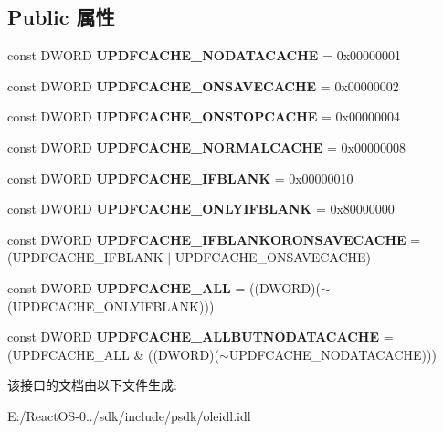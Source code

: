 \subsection*{Public 属性}
\begin{DoxyCompactItemize}
\item 
\mbox{\label{interface_i_ole_cache2_a8d7edcb3d1e03635a0eaf0445adca589}} 
const D\+W\+O\+RD {\bfseries U\+P\+D\+F\+C\+A\+C\+H\+E\+\_\+\+N\+O\+D\+A\+T\+A\+C\+A\+C\+HE} = 0x00000001
\item 
\mbox{\label{interface_i_ole_cache2_a38453c6f32d415d544967d8b824fcdcd}} 
const D\+W\+O\+RD {\bfseries U\+P\+D\+F\+C\+A\+C\+H\+E\+\_\+\+O\+N\+S\+A\+V\+E\+C\+A\+C\+HE} = 0x00000002
\item 
\mbox{\label{interface_i_ole_cache2_ac1ba683506a24cd26e2678f3b2e5e6fd}} 
const D\+W\+O\+RD {\bfseries U\+P\+D\+F\+C\+A\+C\+H\+E\+\_\+\+O\+N\+S\+T\+O\+P\+C\+A\+C\+HE} = 0x00000004
\item 
\mbox{\label{interface_i_ole_cache2_aeed5e914fefacdd934109a8e105271f8}} 
const D\+W\+O\+RD {\bfseries U\+P\+D\+F\+C\+A\+C\+H\+E\+\_\+\+N\+O\+R\+M\+A\+L\+C\+A\+C\+HE} = 0x00000008
\item 
\mbox{\label{interface_i_ole_cache2_a1045b9868e4b8c1b3ffd2c09a15fe153}} 
const D\+W\+O\+RD {\bfseries U\+P\+D\+F\+C\+A\+C\+H\+E\+\_\+\+I\+F\+B\+L\+A\+NK} = 0x00000010
\item 
\mbox{\label{interface_i_ole_cache2_adb7c1aae165944a25588900bb831e1c8}} 
const D\+W\+O\+RD {\bfseries U\+P\+D\+F\+C\+A\+C\+H\+E\+\_\+\+O\+N\+L\+Y\+I\+F\+B\+L\+A\+NK} = 0x80000000
\item 
\mbox{\label{interface_i_ole_cache2_af074d4c570a8542c64088df900679318}} 
const D\+W\+O\+RD {\bfseries U\+P\+D\+F\+C\+A\+C\+H\+E\+\_\+\+I\+F\+B\+L\+A\+N\+K\+O\+R\+O\+N\+S\+A\+V\+E\+C\+A\+C\+HE} = (U\+P\+D\+F\+C\+A\+C\+H\+E\+\_\+\+I\+F\+B\+L\+A\+NK $\vert$ U\+P\+D\+F\+C\+A\+C\+H\+E\+\_\+\+O\+N\+S\+A\+V\+E\+C\+A\+C\+HE)
\item 
\mbox{\label{interface_i_ole_cache2_a76577f290332a4c0e0e8e4a4e409392a}} 
const D\+W\+O\+RD {\bfseries U\+P\+D\+F\+C\+A\+C\+H\+E\+\_\+\+A\+LL} = ((D\+W\+O\+RD)($\sim$(U\+P\+D\+F\+C\+A\+C\+H\+E\+\_\+\+O\+N\+L\+Y\+I\+F\+B\+L\+A\+NK)))
\item 
\mbox{\label{interface_i_ole_cache2_a8728f9dd121389a628429ef2402ef216}} 
const D\+W\+O\+RD {\bfseries U\+P\+D\+F\+C\+A\+C\+H\+E\+\_\+\+A\+L\+L\+B\+U\+T\+N\+O\+D\+A\+T\+A\+C\+A\+C\+HE} = (U\+P\+D\+F\+C\+A\+C\+H\+E\+\_\+\+A\+LL \& ((D\+W\+O\+RD)($\sim$U\+P\+D\+F\+C\+A\+C\+H\+E\+\_\+\+N\+O\+D\+A\+T\+A\+C\+A\+C\+HE)))
\end{DoxyCompactItemize}


该接口的文档由以下文件生成\+:\begin{DoxyCompactItemize}
\item 
E\+:/\+React\+O\+S-\/0../sdk/include/psdk/oleidl.\+idl\end{DoxyCompactItemize}
